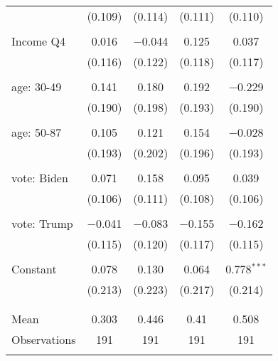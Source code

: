 \begin{tabular}{@{\extracolsep{5pt}}lcccc}
  & (0.109) & (0.114) & (0.111) & (0.110) \\ 
  & & & & \\ 
 Income Q4 & 0.016 & $-$0.044 & 0.125 & 0.037 \\ 
  & (0.116) & (0.122) & (0.118) & (0.117) \\ 
  & & & & \\ 
 age: 30-49 & 0.141 & 0.180 & 0.192 & $-$0.229 \\ 
  & (0.190) & (0.198) & (0.193) & (0.190) \\ 
  & & & & \\ 
 age: 50-87 & 0.105 & 0.121 & 0.154 & $-$0.028 \\ 
  & (0.193) & (0.202) & (0.196) & (0.193) \\ 
  & & & & \\ 
 vote: Biden & 0.071 & 0.158 & 0.095 & 0.039 \\ 
  & (0.106) & (0.111) & (0.108) & (0.106) \\ 
  & & & & \\ 
 vote: Trump & $-$0.041 & $-$0.083 & $-$0.155 & $-$0.162 \\ 
  & (0.115) & (0.120) & (0.117) & (0.115) \\ 
  & & & & \\ 
 Constant & 0.078 & 0.130 & 0.064 & 0.778$^{***}$ \\ 
  & (0.213) & (0.223) & (0.217) & (0.214) \\ 
  & & & & \\ 
\hline \\[-1.8ex] 
Mean & 0.303 & 0.446 & 0.41 & 0.508 \\ 
Observations & 191 & 191 & 191 & 191 \\ 
\hline 
\hline \\[-1.8ex] 
\end{tabular} 
